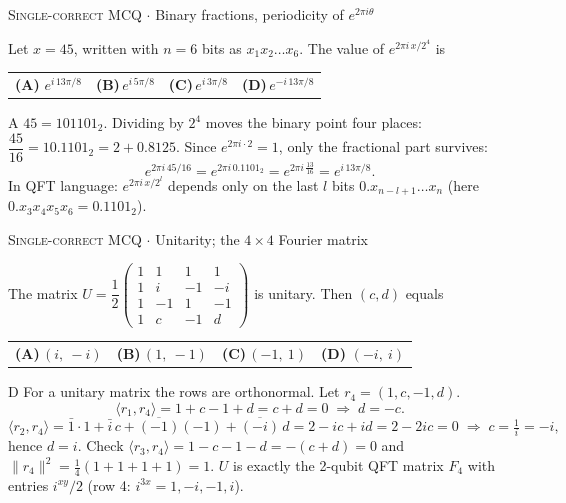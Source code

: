 \documentclass[11pt,a4paper]{article}
\newcommand{\optlabel}[1]{\textbf{(#1)}}
\newcommand{\correctlabel}[1]{\textcolor{okgreen}{\textbf{(#1)}\,\ding{51}}}
\newenvironment{qitem}[1]{\begin{list}{}{\setlength{\leftmargin}{3.3em}\setlength{\labelwidth}{3.1em}%
  \setlength{\labelsep}{0.2em}\setlength{\topsep}{3pt}\setlength{\parsep}{3pt}}\item[\textbf{Q.#1}\hfill]}{\end{list}}
\newcommand{\qsep}{\par\vspace{2pt}{\color{black!15}\hrule}\vspace{4pt}}
\newcommand{\qmeta}[2]{{\footnotesize\color{black!60}\textsc{#1} \;$\cdot$\; #2}\par}
\begin{document}
\begin{qitem}{3}
\qmeta{Single-correct MCQ}{Binary fractions, periodicity of $e^{2\pi i\theta}$}
Let $x = 45$, written with $n = 6$ bits as $x_1x_2\dots x_6$. The value of $e^{2\pi i\,x/2^4}$ is
\par\smallskip\noindent\begin{tabularx}{\linewidth}{@{}*{4}{L}@{}}
\correctlabel{A}\,$e^{i\,13\pi/8}$ & \optlabel{B}\,$e^{i\,5\pi/8}$ & \optlabel{C}\,$e^{i\,3\pi/8}$ & \optlabel{D}\,$e^{-i\,13\pi/8}$
\end{tabularx}
\end{qitem}
\begin{solbox}{A}
$45 = 101101_2$. Dividing by $2^4$ moves the binary point four places: $\dfrac{45}{16} = 10.1101_2 = 2 + 0.8125$.
Since $e^{2\pi i\cdot 2} = 1$, only the fractional part survives:
\[ e^{2\pi i\,45/16} = e^{2\pi i\,0.1101_2} = e^{2\pi i\,\frac{13}{16}} = e^{i\,13\pi/8}. \]
In QFT language: $e^{2\pi i\,x/2^l}$ depends only on the last $l$ bits $0.x_{n-l+1}\dots x_n$ (here $0.x_3x_4x_5x_6 = 0.1101_2$).
\end{solbox}
\qsep

\begin{qitem}{4}
\qmeta{Single-correct MCQ}{Unitarity; the $4\times4$ Fourier matrix}
The matrix $U = \dfrac12\begin{pmatrix}1&1&1&1\\ 1&i&-1&-i\\ 1&-1&1&-1\\ 1&c&-1&d\end{pmatrix}$ is unitary. Then $(c, d)$ equals
\par\smallskip\noindent\begin{tabularx}{\linewidth}{@{}*{4}{L}@{}}
\optlabel{A}\,$(i,\ -i)$ & \optlabel{B}\,$(1,\ -1)$ & \optlabel{C}\,$(-1,\ 1)$ & \correctlabel{D}\,$(-i,\ i)$
\end{tabularx}
\end{qitem}
\begin{solbox}{D}
For a unitary matrix the rows are orthonormal. Let $r_4 = (1, c, -1, d)$.
\[ \langle r_1, r_4\rangle = 1 + c - 1 + d = c + d = 0 \;\Rightarrow\; d = -c. \]
\[ \langle r_2, r_4\rangle = \bar1\cdot1 + \bar i\,c + \overline{(-1)}(-1) + \overline{(-i)}\,d = 2 - ic + id = 2 - 2ic = 0 \;\Rightarrow\; c = \tfrac{1}{i} = -i, \]
hence $d = i$. Check $\langle r_3, r_4\rangle = 1 - c - 1 - d = -(c+d) = 0$ and $\|r_4\|^2 = \tfrac14(1+1+1+1) = 1$.
$U$ is exactly the 2-qubit QFT matrix $F_4$ with entries $i^{xy}/2$ (row 4: $i^{3x} = 1, -i, -1, i$).
\end{solbox}
\qsep
\end{document}
